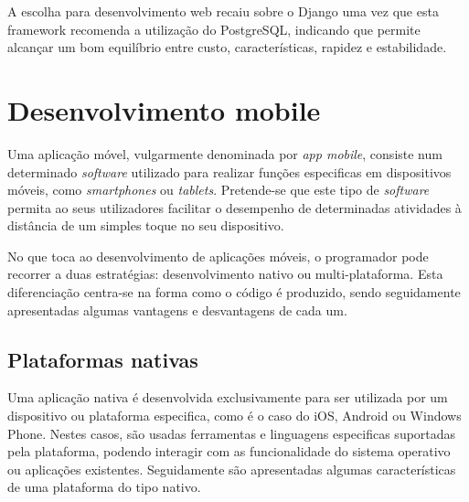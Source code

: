 A escolha para desenvolvimento web recaiu sobre o Django uma vez que esta framework recomenda a utilização do PostgreSQL, indicando que permite alcançar um bom equilíbrio entre custo, características, rapidez e estabilidade\cite{Holovaty2009}. 













\newpage
\section{Desenvolvimento mobile}


Uma aplicação móvel, vulgarmente denominada por \textit{app mobile}, consiste num determinado \textit{software} utilizado para realizar funções especificas em dispositivos móveis, como \textit{smartphones} ou \textit{tablets}. Pretende-se que este tipo de \textit{software} permita ao seus utilizadores facilitar o desempenho de determinadas atividades à distância de um simples toque no seu dispositivo. 

No que toca ao desenvolvimento de aplicações móveis, o programador pode recorrer a duas estratégias: desenvolvimento nativo ou multi-plataforma. Esta diferenciação centra-se na forma como o código é produzido, sendo seguidamente apresentadas algumas  vantagens e desvantagens de cada um. 





\subsection{Plataformas nativas}

Uma aplicação nativa é desenvolvida exclusivamente para ser utilizada por um dispositivo ou plataforma especifica, como é o caso do iOS, Android ou Windows Phone. Nestes casos, são usadas ferramentas e linguagens especificas suportadas pela plataforma, podendo interagir com as funcionalidade do sistema operativo ou aplicações existentes. Seguidamente são apresentadas algumas características de uma plataforma do tipo nativo\cite{Ibm2012a}. 








